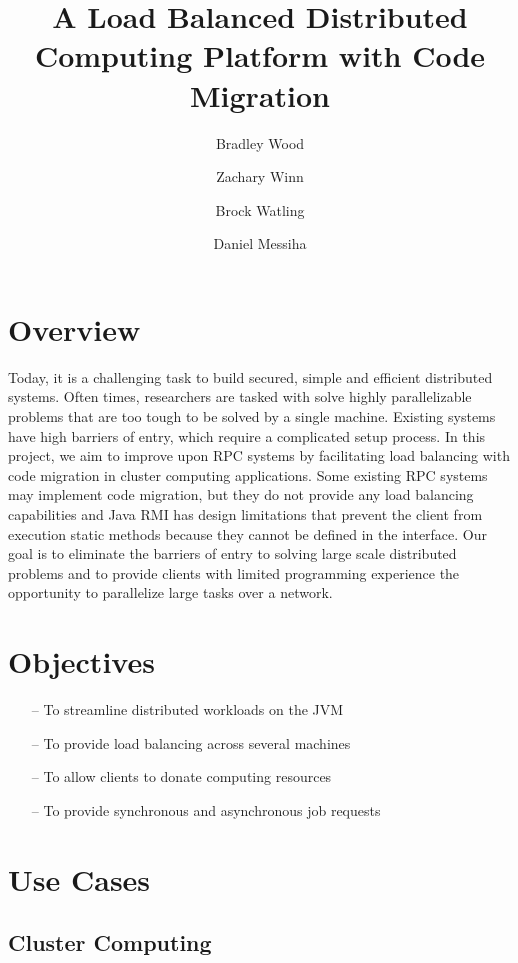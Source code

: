 \documentclass[12pt, oneside,english]{article}
\title{A Load Balanced Distributed Computing Platform with Code Migration}
\author[1]{Bradley Wood}
\author[2]{Zachary Winn}
\author[3]{Brock Watling}
\author[4]{Daniel Messiha}
\affil[ ]{University of Ontario Institute of Technology}
\date{}
\begin{document}
    \maketitle

    \section{Overview}\label{sec:overview}

    Today, it is a challenging task to build secured,
    simple and efficient distributed systems.
    Often times, researchers are tasked with solve highly
    parallelizable problems that are too tough to be solved
    by a single machine. Existing systems have high barriers
    of entry, which require a complicated setup process.
    In this project, we aim to improve upon RPC systems
    by facilitating load balancing with code migration
    in cluster computing applications.
    Some existing RPC systems may implement code migration,
    but they do not provide any load balancing capabilities
    and Java RMI has design limitations that prevent the
    client from execution static methods because they cannot
    be defined in the interface.
    Our goal is to eliminate the barriers of entry to
    solving large scale distributed problems and to provide
    clients with limited programming experience the opportunity
    to parallelize large tasks over a network.

    \section{Objectives}\label{sec:objectives}

    \begin{itemize}
        \item[--] To streamline distributed workloads on the JVM
        \item[--] To provide load balancing across several machines
        \item[--] To allow clients to donate computing resources
        \item[--] To provide synchronous and asynchronous job requests
    \end{itemize}

    \section{Use Cases}\label{sec:useCases}

    \subsection{Cluster Computing}
\end{document}
